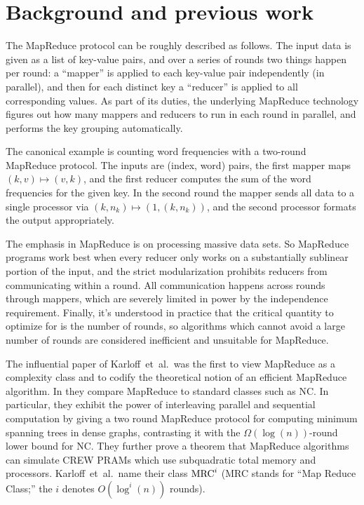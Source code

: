 \documentclass[11pt]{article}
\theoremstyle{definition}
\theoremstyle{remark}
\newcommand{\mrc}{\textup{MRC}}
\begin{document}
\section{Background and previous work}

The MapReduce protocol can be roughly described as follows. The input data is
given as a list of key-value pairs, and over a series of rounds two things
happen per round: a ``mapper'' is applied to each key-value pair independently
(in parallel), and then for each distinct key a ``reducer'' is applied to all
corresponding values. As part of its duties, the underlying MapReduce
technology figures out how many mappers and reducers to run in each round in
parallel, and performs the key grouping automatically.

The canonical example is counting word frequencies with a two-round MapReduce
protocol. The inputs are (index, word) pairs, the first mapper maps $(k,v)
\mapsto (v,k)$, and the first reducer computes the sum of the word frequencies
for the given key. In the second round the mapper sends all data to a single
processor via $(k, n_k) \mapsto (1, (k, n_k))$, and the second processor
formats the output appropriately.

The emphasis in MapReduce is on processing massive data sets. So MapReduce
programs work best when every reducer only works on a substantially sublinear
portion of the input, and the strict modularization prohibits reducers from
communicating within a round. All communication happens across rounds through
mappers, which are severely limited in power by the independence requirement.
Finally, it's understood in practice that the critical quantity to optimize for
is the number of rounds, so algorithms which cannot avoid a large number of
rounds are considered inefficient and unsuitable for MapReduce. 

The influential paper of Karloff~et~al.~was the first to view MapReduce as a
complexity class and to codify the theoretical notion of an efficient MapReduce
algorithm.  In \cite{Karloff10} they compare MapReduce to standard classes such
as NC. In particular, they exhibit the power of interleaving parallel and
sequential computation by giving a two round MapReduce protocol for computing
minimum spanning trees in dense graphs, contrasting it with the
$\Omega(\log(n))$-round lower bound for NC. They further prove a theorem that
MapReduce algorithms can simulate CREW PRAMs which use subquadratic total
memory and processors.  Karloff~et~al.\ name their class $\mrc^i$ (MRC stands
for ``Map Reduce Class;'' the $i$ denotes $O(\log^i(n))$ rounds). 
\end{document}

